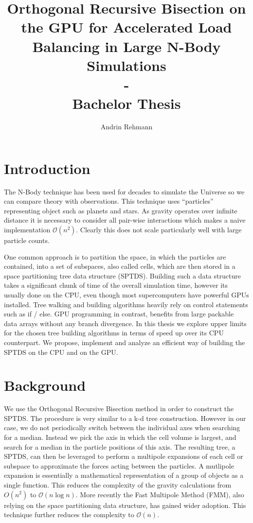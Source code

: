 \documentclass[]{article}
\title{Orthogonal Recursive Bisection on the GPU for Accelerated Load Balancing in Large N-Body Simulations \\ - \\ Bachelor Thesis}
\author{Andrin Rehmann}
\begin{document}
\maketitle

\newpage

\tableofcontents

\newpage
\section{Introduction}


The N-Body technique has been used for decades to simulate the Universe so we can compare theory with observations. This technique uses ``particles'' representing object such as planets and stars. As gravity operates over infinite distance it is necessary to consider all pair-wise interactions which makes a naive implementation $\mathcal{O}(n^2)$. Clearly this does not scale particularly well with large particle counts.

One common approach is to partition the space, in which the particles are contained, into a set of subspaces, also called cells, which are then stored in a space partitioning tree data structure (SPTDS). Building such a data structure takes a significant chunk of time of the overall simulation time, however its usually done on the CPU, even though most supercomputers have powerful GPUs installed. Tree walking and building algorithms heavily rely on control statements such as if / else. GPU programming in contrast, benefits from large packable data arrays without any branch divergence. In this thesis we explore upper limits for the chosen tree building algorithms in terms of speed up over its CPU counterpart. We propose, implement and analyze an efficient way of building the SPTDS on the CPU and on the GPU. 


\newpage
\section{Background}

We use the Orthogonal Recursive Bisection method in order to construct the SPTDS. The procedure is very similar to a k-d tree construction. However in our case, we do not periodically switch between the individual axes when searching for a median. Instead we pick the axis in which the cell volume is largest, and search for a median in the particle positions of this axis. The resulting tree, a SPTDS, can then be leveraged to perform a multipole expansions of each cell or subspace to approximate the forces acting between the particles. A mutlipole expansion is essentially a mathematical representation of a group of objects as a single function.
This reduces the complexity of the gravity calculations from $O(n^2)$ to $\mathcal{O}(n\log{}n)$. More recently the Fast Multipole Method (FMM), also relying on the space partitioning data structure, has gained wider adoption. This technique further reduces the complexity to $\mathcal{O}(n)$. 
\end{document}
